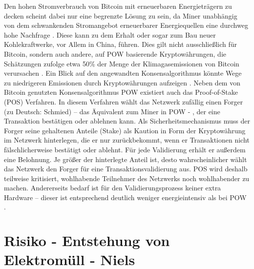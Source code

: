 		Den hohen Stromverbrauch von Bitcoin mit erneuerbaren Energieträgern zu decken scheint dabei nur eine begrenzte Lösung zu sein, da Miner unabhängig von dem schwankenden Stromangebot erneuerbarer Energiequellen eine durchweg hohe Nachfrage \cite{vries_renewable_2019}. Diese kann zu dem Erhalt oder sogar zum Bau neuer Kohlekraftwerke, vor Allem in China, führen. Dies gilt nicht ausschließlich für Bitcoin, sondern auch andere, auf POW basierende Kryptowährungen, die Schätzungen zufolge etwa 50\% der Menge der Klimagasemissionen von Bitcoin verursachen \cite{gallersdorfer_energy_2020}. Ein Blick auf den angewandten Konsensalgorithmus könnte Wege zu niedrigeren Emissionen durch Kryptowährungen aufzeigen \cite{vries_renewable_2019}\cite{schinckus_good_2020}. \newline
		Neben dem von Bitcoin genutzten Konsensalgorithmus POW existiert auch das Proof-of-Stake (POS) Verfahren. In diesem Verfahren wählt das Netzwerk zufällig einen Forger (zu Deutsch: Schmied) – das Äquivalent zum Miner in POW - , der eine Transaktion bestätigen oder ablehnen kann. Als Sicherheitsmechanismus muss der Forger seine gehaltenen Anteile (Stake) als Kaution in Form der Kryptowährung im Netzwerk hinterlegen, die er nur zurückbekommt, wenn er Transaktionen nicht fälschlicherweise bestätigt oder ablehnt. Für jede Validierung erhält er außerdem eine Belohnung. Je größer der hinterlegte Anteil ist, desto wahrscheinlicher wählt das Netzwerk den Forger für eine Transaktionsvalidierung aus. POS wird deshalb teilweise kritisiert, wohlhabende Teilnehmer des Netzwerks noch wohlhabender zu machen. Andererseits bedarf ist für den Validierungsprozess keiner extra Hardware – dieser ist entsprechend deutlich weniger energieintensiv als bei POW \cite{adam_konsensmodelle_2020}\cite{schinckus_good_2020}. 
\section{Risiko - Entstehung von Elektromüll - Niels}

